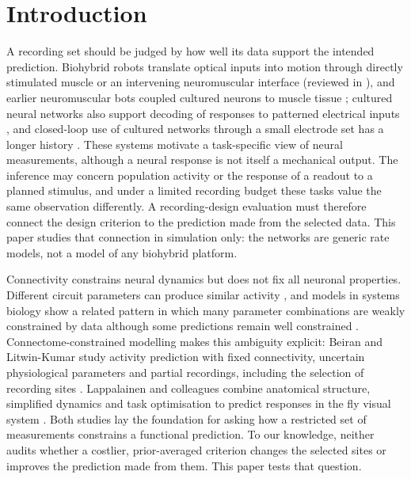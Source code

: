 \section{Introduction}

A recording set should be judged by how well its data support the intended prediction. Biohybrid robots translate optical inputs into motion through directly stimulated muscle or an intervening neuromuscular interface \cite{ref01,ref02} (reviewed in \cite{ref26}), and earlier neuromuscular bots coupled cultured neurons to muscle tissue \cite{ref27}; cultured neural networks also support decoding of responses to patterned electrical inputs \cite{ref03}, and closed-loop use of cultured networks through a small electrode set has a longer history \cite{ref28}. These systems motivate a task-specific view of neural measurements, although a neural response is not itself a mechanical output. The inference may concern population activity or the response of a readout to a planned stimulus, and under a limited recording budget these tasks value the same observation differently. A recording-design evaluation must therefore connect the design criterion to the prediction made from the selected data. This paper studies that connection in simulation only: the networks are generic rate models, not a model of any biohybrid platform.

Connectivity constrains neural dynamics but does not fix all neuronal properties. Different circuit parameters can produce similar activity \cite{ref04}, and models in systems biology show a related pattern in which many parameter combinations are weakly constrained by data although some predictions remain well constrained \cite{ref29}. Connectome-constrained modelling makes this ambiguity explicit: Beiran and Litwin-Kumar study activity prediction with fixed connectivity, uncertain physiological parameters and partial recordings, including the selection of recording sites \cite{ref05}. Lappalainen and colleagues combine anatomical structure, simplified dynamics and task optimisation to predict responses in the fly visual system \cite{ref06}. Both studies lay the foundation for asking how a restricted set of measurements constrains a functional prediction. To our knowledge, neither audits whether a costlier, prior-averaged criterion changes the selected sites or improves the prediction made from them. This paper tests that question.

